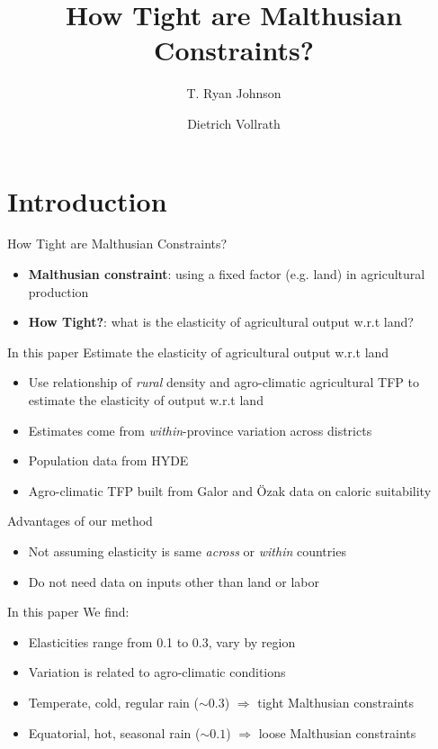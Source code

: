 \documentclass[10pt, xcolor=dvipsnames]{beamer}
\title[Land Constraints]{{How Tight are Malthusian Constraints?}}
\author[Johnson \& Vollrath]{T. Ryan Johnson \inst{1} \and Dietrich Vollrath \inst{2}}
\institute[UH]{\inst{1} University of Houston \and %
                      \inst{2} University of Houston}
\date[May 2017]{}
\begin{document}
\maketitle

\section{Introduction}

\begin{frame}{How Tight are Malthusian Constraints?}\label{define}

\begin{itemize}
  \item \textbf{Malthusian constraint}: using a fixed factor (e.g. land) in agricultural production
  \item \textbf{How Tight?}: what is the elasticity of agricultural output w.r.t land?
\end{itemize}

\end{frame}


\begin{frame}{In this paper}
Estimate the elasticity of agricultural output w.r.t land
\begin{itemize}
  \item Use relationship of \textit{rural} density and agro-climatic agricultural TFP to estimate the elasticity of output w.r.t land
  \item Estimates come from \textit{within}-province variation across districts
  \item Population data from HYDE
  \item Agro-climatic TFP built from Galor and {\"O}zak data on caloric suitability
\end{itemize}

\vspace{.2cm} Advantages of our method
\begin{itemize}
  \item Not assuming elasticity is same \textit{across} or \textit{within} countries
  \item Do not need data on inputs other than land or labor
\end{itemize}

\end{frame}

\begin{frame}{In this paper}
We find:
\begin{itemize}
  \item Elasticities range from 0.1 to 0.3, vary by region
  \item Variation is related to agro-climatic conditions
  \item Temperate, cold, regular rain ($\sim 0.3$) $\Rightarrow$ tight Malthusian constraints
  \item Equatorial, hot, seasonal rain ($\sim 0.1$) $\Rightarrow$ loose Malthusian constraints
\end{itemize}

\end{frame}
\end{document}
